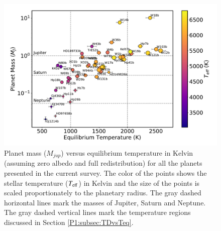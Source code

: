 \begin{figure}
    \centering
    \includegraphics[width = \linewidth]{MassTemperature.pdf}
    \caption{Planet mass ($M_{jup}$) versus equilibrium temperature in Kelvin (assuming zero albedo and full redistribution) for all the planets presented in the current survey. The color of the points shows the stellar temperature ($T_{\rm eff}$) in Kelvin and the size of the points is scaled proportionately to the planetary radius. The gray dashed horizontal lines mark the masses of Jupiter, Saturn and Neptune. The gray dashed vertical lines mark the temperature regions discussed in Section \ref{P1:subsec:TDvsTeq}.}
    \label{P1:fig:planets}
\end{figure}


